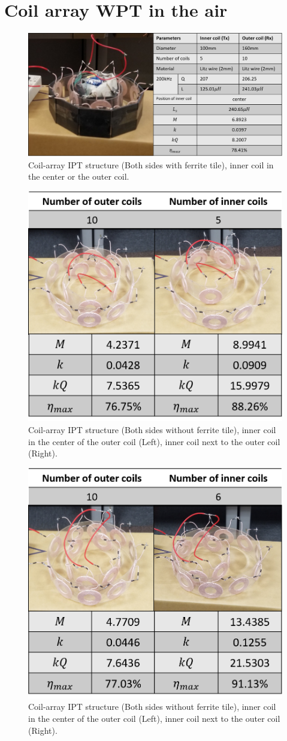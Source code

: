\section{Coil array WPT in the air}
\begin{figure}[htbp]
    \centering
    \includegraphics[width=1.0\linewidth]{images/4_coil_5_10_with_ferrite.png}
    \caption{Coil-array IPT structure (Both sides with ferrite tile), inner coil in the center or the outer coil.}
\end{figure}
\begin{figure}[htbp]
    \centering
    \includegraphics[width=0.6\linewidth]{images/4_coil_5_10_without_ferrite.png}
    \caption{Coil-array IPT structure (Both sides without ferrite tile), inner coil in the center of the outer coil (Left), inner coil next to the outer coil (Right).}
\end{figure}
\begin{figure}[htbp]
    \centering
    \includegraphics[width=0.6\linewidth]{images/4_coil_6_10_without_ferrite.png}
    \caption{Coil-array IPT structure (Both sides without ferrite tile), inner coil in the center of the outer coil (Left), inner coil next to the outer coil (Right).}
\end{figure}
